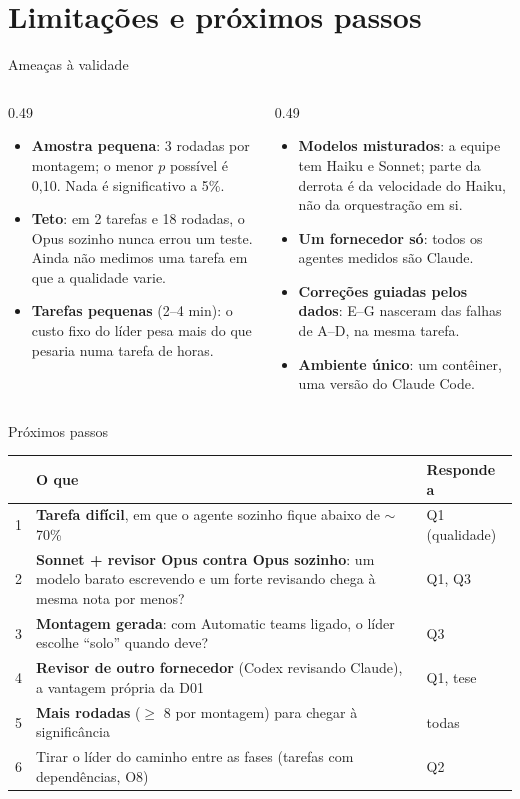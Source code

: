 \documentclass[11pt,aspectratio=169]{beamer}
\begin{document}
\section{Limitações e próximos passos}

\begin{frame}{Ameaças à validade}
\begin{columns}[T]
\begin{column}{0.49\linewidth}
\small
\begin{itemize}\setlength\itemsep{0.45em}
\item \textbf{Amostra pequena}: 3 rodadas por montagem; o menor $p$ possível é 0,10. Nada é significativo a 5\%.
\item \textbf{Teto}: em 2 tarefas e 18 rodadas, o Opus sozinho nunca errou um teste. Ainda não medimos uma
  tarefa em que a qualidade varie.
\item \textbf{Tarefas pequenas} (2--4 min): o custo fixo do líder pesa mais do que pesaria numa tarefa de horas.
\end{itemize}
\end{column}
\begin{column}{0.49\linewidth}
\small
\begin{itemize}\setlength\itemsep{0.45em}
\item \textbf{Modelos misturados}: a equipe tem Haiku e Sonnet; parte da derrota é da velocidade do Haiku, não
  da orquestração em si.
\item \textbf{Um fornecedor só}: todos os agentes medidos são Claude.
\item \textbf{Correções guiadas pelos dados}: E--G nasceram das falhas de A--D, na mesma tarefa.
\item \textbf{Ambiente único}: um contêiner, uma versão do Claude Code.
\end{itemize}
\end{column}
\end{columns}
\end{frame}

\begin{frame}{Próximos passos}
\small
\begin{tabularx}{\linewidth}{@{}l X l@{}}
\toprule
& O que & Responde a \\
\midrule
1 & \textbf{Tarefa difícil}, em que o agente sozinho fique abaixo de $\sim$70\% & Q1 (qualidade) \\
2 & \textbf{Sonnet + revisor Opus contra Opus sozinho}: um modelo barato escrevendo e um forte revisando chega à mesma
  nota por menos? & Q1, Q3 \\
3 & \textbf{Montagem gerada}: com Automatic teams ligado, o líder escolhe ``solo'' quando deve? & Q3 \\
4 & \textbf{Revisor de outro fornecedor} (Codex revisando Claude), a vantagem própria da D01 & Q1, tese \\
5 & \textbf{Mais rodadas} ($\geq$ 8 por montagem) para chegar à significância & todas \\
6 & Tirar o líder do caminho entre as fases (tarefas com dependências, O8) & Q2 \\
\bottomrule
\end{tabularx}
\end{frame}
\end{document}
